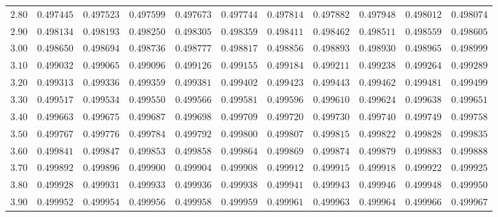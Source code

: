 \begin{tabular}{rrrrrrrrrrr}
  $2.80$ & $0.497445$ & $0.497523$ & $0.497599$ & $0.497673$ & $0.497744$ & $0.497814$ & $0.497882$ & $0.497948$ & $0.498012$ & $0.498074$ \\ 
  $2.90$ & $0.498134$ & $0.498193$ & $0.498250$ & $0.498305$ & $0.498359$ & $0.498411$ & $0.498462$ & $0.498511$ & $0.498559$ & $0.498605$ \\ 
  $3.00$ & $0.498650$ & $0.498694$ & $0.498736$ & $0.498777$ & $0.498817$ & $0.498856$ & $0.498893$ & $0.498930$ & $0.498965$ & $0.498999$ \\ 
  $3.10$ & $0.499032$ & $0.499065$ & $0.499096$ & $0.499126$ & $0.499155$ & $0.499184$ & $0.499211$ & $0.499238$ & $0.499264$ & $0.499289$ \\ 
  $3.20$ & $0.499313$ & $0.499336$ & $0.499359$ & $0.499381$ & $0.499402$ & $0.499423$ & $0.499443$ & $0.499462$ & $0.499481$ & $0.499499$ \\ 
  $3.30$ & $0.499517$ & $0.499534$ & $0.499550$ & $0.499566$ & $0.499581$ & $0.499596$ & $0.499610$ & $0.499624$ & $0.499638$ & $0.499651$ \\ 
  $3.40$ & $0.499663$ & $0.499675$ & $0.499687$ & $0.499698$ & $0.499709$ & $0.499720$ & $0.499730$ & $0.499740$ & $0.499749$ & $0.499758$ \\ 
  $3.50$ & $0.499767$ & $0.499776$ & $0.499784$ & $0.499792$ & $0.499800$ & $0.499807$ & $0.499815$ & $0.499822$ & $0.499828$ & $0.499835$ \\ 
  $3.60$ & $0.499841$ & $0.499847$ & $0.499853$ & $0.499858$ & $0.499864$ & $0.499869$ & $0.499874$ & $0.499879$ & $0.499883$ & $0.499888$ \\ 
  $3.70$ & $0.499892$ & $0.499896$ & $0.499900$ & $0.499904$ & $0.499908$ & $0.499912$ & $0.499915$ & $0.499918$ & $0.499922$ & $0.499925$ \\ 
  $3.80$ & $0.499928$ & $0.499931$ & $0.499933$ & $0.499936$ & $0.499938$ & $0.499941$ & $0.499943$ & $0.499946$ & $0.499948$ & $0.499950$ \\ 
  $3.90$ & $0.499952$ & $0.499954$ & $0.499956$ & $0.499958$ & $0.499959$ & $0.499961$ & $0.499963$ & $0.499964$ & $0.499966$ & $0.499967$ \\ 
   \hline
\end{tabular}
